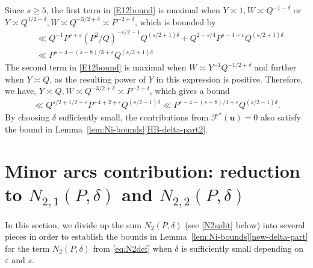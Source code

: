 \documentclass[letterpaper,11pt]{amsart}
\numberwithin{equation}{section}
\theoremstyle{definition}
\numberwithin{equation}{section}
\newcommand{\uu}{\mathbf{u}}
\newcommand{\ve}{\varepsilon}
\begin{document}
Since $s\geq 5$, the first term in \eqref{E12bound} is maximal when $Y\asymp 1, W\asymp  Q^{-1-\delta}$ or $Y\asymp Q^{1/2-\delta},W\asymp Q^{-3/2+\delta}\asymp P^{-2+\delta}$, which is bounded by
\begin{align*}
&\ll Q^{-1}P^{s+\ve} (P^2/Q)^{-s/2-1}Q^{(s/2+1)\delta}+Q^{2-s/4}P^{s-4+\ve}Q^{(s/2+1)\delta}\\&\ll P^{s-4-(s-8)/3+\ve}Q^{(s/2+1)\delta}
\end{align*}
The second term in \eqref{E12bound} is maximal when $W\asymp Y^{-1}Q^{-1/2+\delta}$ and further when $Y\asymp Q$, as the resulting power of $Y$ in this expression is positive. Therefore, we have, $Y\asymp Q,W\asymp Q^{-3/2+\delta}\asymp P^{-2+\delta}$, which gives a bound
\begin{align*}
\ll Q^{s/2+1/2+\ve }P^{-4+2+\ve}Q^{(s/2-1)\delta}
\ll P^{s-4-(s-8)/3+\ve}Q^{(s/2-1)\delta}.
\end{align*}
By choosing $\delta$ sufficiently small, the contributions from $\mathcal F^*(\uu)=0$ also satisfy the bound in Lemma~\ref{lem:Ni-bounds}\eqref{HB-delta-part2}. 

\section{Minor arcs contribution: reduction to \texorpdfstring{$N_{2,1}(P, \delta)$ and $N_{2,2}(P, \delta)$}{N21(P, δ) and N22(P, δ)}}\label{sec:preparing-N2}
In this section, we divide up the sum $N_2(P,\delta)$ (see \eqref{N2split} below) into several pieces in order to establish the bounds in Lemma~\ref{lem:Ni-bounds}\eqref{new-delta-part} for the term $N_2(P, \delta)$ from \eqref{eq:N2def}
when $\delta$ is sufficiently small depending on $\ve$ and $s$. 
\end{document}
